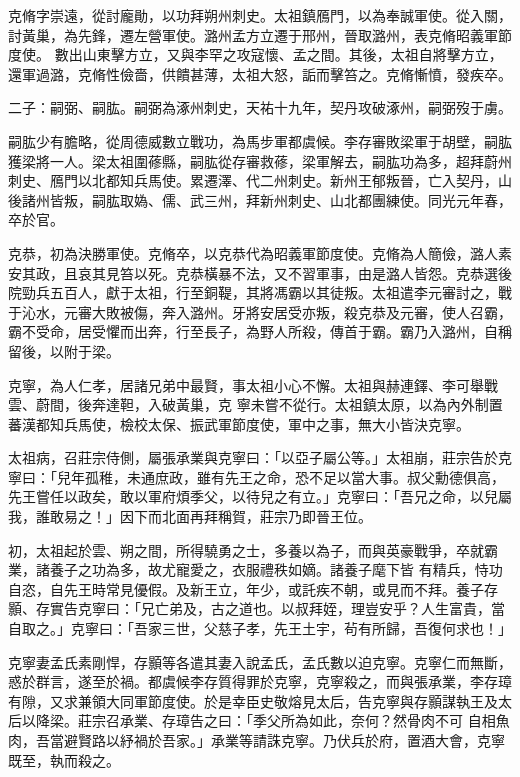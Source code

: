\begin{pinyinscope}
 克脩字崇遠，從討龐勛，以功拜朔州刺史。太祖鎮鴈門，以為奉誠軍使。從入關，討黃巢，為先鋒，遷左營軍使。潞州孟方立遷于邢州，晉取潞州，表克脩昭義軍節度使。
 數出山東擊方立，又與李罕之攻寇懷、孟之間。其後，太祖自將擊方立，還軍過潞，克脩性儉嗇，供饋甚薄，太祖大怒，詬而擊笞之。克脩慚憤，發疾卒。



 二子：嗣弼、嗣肱。嗣弼為涿州刺史，天祐十九年，契丹攻破涿州，嗣弼歿于虜。



 嗣肱少有膽略，從周德威數立戰功，為馬步軍都虞候。李存審敗梁軍于胡壁，嗣肱獲梁將一人。梁太祖圍蓚縣，嗣肱從存審救蓚，梁軍解去，嗣肱功為多，超拜蔚州刺史、鴈門以北都知兵馬使。累遷澤、代二州刺史。新州王郁叛晉，亡入契丹，山後諸州皆叛，嗣肱取媯、儒、武三州，拜新州刺史、山北都團練使。同光元年春，卒於官。



 克恭，初為決勝軍使。克脩卒，以克恭代為昭義軍節度使。克脩為人簡儉，潞人素安其政，且哀其見笞以死。克恭橫暴不法，又不習軍事，由是潞人皆怨。克恭選後院勁兵五百人，獻于太祖，行至銅鞮，其將馮霸以其徒叛。太祖遣李元審討之，戰于沁水，元審大敗被傷，奔入潞州。牙將安居受亦叛，殺克恭及元審，使人召霸，霸不受命，居受懼而出奔，行至長子，為野人所殺，傳首于霸。霸乃入潞州，自稱留後，以附于梁。



 克寧，為人仁孝，居諸兄弟中最賢，事太祖小心不懈。太祖與赫連鐸、李可舉戰雲、蔚間，後奔達靼，入破黃巢，克
 寧未嘗不從行。太祖鎮太原，以為內外制置蕃漢都知兵馬使，檢校太保、振武軍節度使，軍中之事，無大小皆決克寧。



 太祖病，召莊宗侍側，屬張承業與克寧曰：「以亞子屬公等。」太祖崩，莊宗告於克寧曰：「兒年孤稚，未通庶政，雖有先王之命，恐不足以當大事。叔父勳德俱高，先王嘗任以政矣，敢以軍府煩季父，以待兒之有立。」克寧曰：「吾兄之命，以兒屬我，誰敢易之！」因下而北面再拜稱賀，莊宗乃即晉王位。



 初，太祖起於雲、朔之間，所得驍勇之士，多養以為子，而與英豪戰爭，卒就霸業，諸養子之功為多，故尤寵愛之，衣服禮秩如嫡。諸養子麾下皆
 有精兵，恃功自恣，自先王時常見優假。及新王立，年少，或託疾不朝，或見而不拜。養子存顥、存實告克寧曰：「兄亡弟及，古之道也。以叔拜姪，理豈安乎？人生富貴，當自取之。」克寧曰：「吾家三世，父慈子孝，先王土宇，茍有所歸，吾復何求也！」



 克寧妻孟氏素剛悍，存顥等各遣其妻入說孟氏，孟氏數以迫克寧。克寧仁而無斷，惑於群言，遂至於禍。都虞候李存質得罪於克寧，克寧殺之，而與張承業，李存璋有隙，又求兼領大同軍節度使。於是幸臣史敬熔見太后，告克寧與存顥謀執王及太后以降梁。莊宗召承業、存璋告之曰：「季父所為如此，奈何？然骨肉不可
 自相魚肉，吾當避賢路以紓禍於吾家。」承業等請誅克寧。乃伏兵於府，置酒大會，克寧既至，執而殺之。




\end{pinyinscope}
